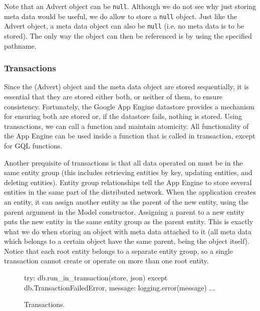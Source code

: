 Note that an Advert object can be \texttt{null}. Although we do not see why just
storing meta data would be useful, we do allow to store a \texttt{null} object.
Just like the Advert object, a meta data object can also be \texttt{null} (i.e.
no meta data is to be stored). The only way the object can then be referenced is
by using the specified pathname.

\subsubsection{Transactions}
\label{serverimpl-transactions}
Since the (Advert) object and the meta data object are stored sequentially, it
is essential that they are stored either both, or neither of them, to ensure
consistency. Fortunately, the Google App Engine datastore provides a mechanism
for ensuring both are stored or, if the datastore fails, nothing is stored.
Using transactions, we can call a function and maintain atomicity. All
functionality of the App Engine can be used inside a function that is called in
transaction, except for GQL functions.

Another prequisite of transactions is that all data operated on must be in the
same entity group (this includes retrieving entities by key, updating entities, and
deleting entities). Entity group relationships tell the App Engine to store
several entities in the same part of the distributed network. When the application
creates an entity, it can assign another entity as the parent of the new entity,
using the parent argument in the Model constructor. Assigning a parent to a new
entity puts the new entity in the same entity group as the parent entity. This is
exactly what we do when storing an object with meta data attached to it (all
meta data which belongs to a certain object have the same parent, being the
object itself). Notice that each root entity belongs to a separate entity group,
so a single transaction cannot create or operate on more than one root entity. 

\begin{figure*}[ht] %
\begin{center}
\begin{code}
try:
  db.run_in_transaction(store, json) 
except db.TransactionFailedError, message:
  logging.error(message)
  ...
\end{code}
\caption{Transactions.\label{serverimpl-trans-func}}
\end{center}
\end{figure*}

